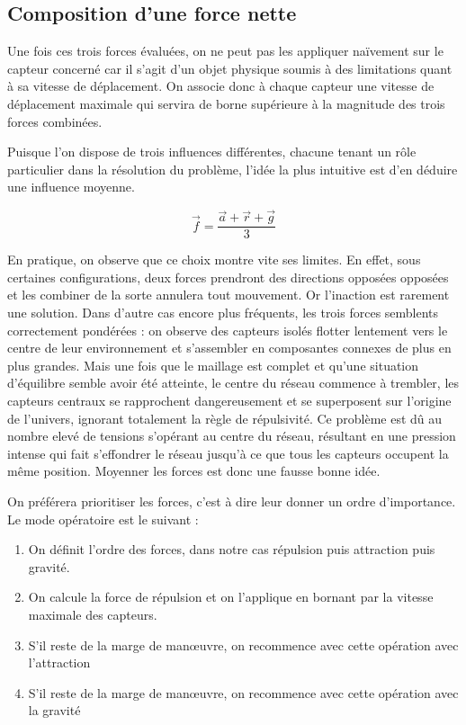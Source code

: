 \documentclass[10pt]{article}
\begin{document}
\begin{multicols}{2}
\subsection*{Composition d'une force nette}

Une fois ces trois forces évaluées, on ne peut pas les appliquer
naïvement sur le capteur concerné car il s'agit d'un objet physique
soumis à des limitations quant à sa vitesse de déplacement. On associe
donc à chaque capteur une vitesse de déplacement maximale qui servira
de borne supérieure à la magnitude des trois forces combinées.

Puisque l'on dispose de trois influences différentes, chacune tenant
un rôle particulier dans la résolution du problème, l'idée la plus
intuitive est d'en déduire une influence moyenne.

$$
\vec{f} = \frac{\vec{a} + \vec{r} + \vec{g}}{3}
$$

En pratique, on observe que ce choix montre vite ses limites. En
effet, sous certaines configurations, deux forces prendront des
directions opposées opposées et les combiner de la sorte annulera tout
mouvement. Or l'inaction est rarement une solution. Dans d'autre cas
encore plus fréquents, les trois forces semblents correctement
pondérées : on observe des capteurs isolés flotter lentement vers le
centre de leur environnement et s'assembler en composantes connexes de
plus en plus grandes. Mais une fois que le maillage est complet et
qu'une situation d'équilibre semble avoir été atteinte, le centre du
réseau commence à trembler, les capteurs centraux se rapprochent
dangereusement et se superposent sur l'origine de l'univers, ignorant
totalement la règle de répulsivité. Ce problème est dû au nombre elevé
de tensions s'opérant au centre du réseau, résultant en une pression
intense qui fait s'effondrer le réseau jusqu'à ce que tous les
capteurs occupent la même position. Moyenner les forces est donc une
fausse bonne idée.

On préférera prioritiser les forces, c'est à dire leur donner un ordre
d'importance. Le mode opératoire est le suivant :

\begin{enumerate}
\item{On définit l'ordre des forces, dans notre cas répulsion puis
  attraction puis gravité.}
\item{On calcule la force de répulsion et on l'applique en bornant par
  la vitesse maximale des capteurs.}
\item{S'il reste de la marge de man\oe uvre, on recommence avec cette
  opération avec l'attraction}
\item{S'il reste de la marge de man\oe uvre, on recommence avec cette
  opération avec la gravité}
\end{enumerate}


\end{multicols}
\end{document}
